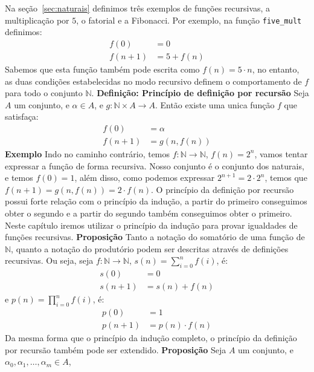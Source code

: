 Na seção~\ref{sec:naturais} definimos três exemplos de funções recursivas, a multiplicação por $5$, o fatorial e a Fibonacci.
Por exemplo, na função \lstinline{five_mult} definimos:
\begin{align*}
    f(0) &= 0  \\
     f(n+1) &= 5 + f(n) 
\end{align*}
Sabemos que esta função também pode escrita como $f(n) = 5\cdot n$, no entanto, as duas condições estabelecidas
no modo recursivo definem o comportamento de $f$ para todo o conjunto $\mathbb{N}$.
\newline \textbf{Definição: Princípio de definição por recursão} Seja $A$ um conjunto, e $\alpha \in A$,
e $g : \mathbb{N} \times A \to A$. Então existe uma unica função $f$ que satisfaça:
\begin{align*}
     f(0) &= \alpha \\
     f(n+1) &= g(n, f(n))
\end{align*} 
\textbf{Exemplo} Indo no caminho contrário, temos $f : \mathbb{N} \to \mathbb{N}$, $f(n) = 2^n$, vamos
tentar expressar a função de forma recursiva. Nosso conjunto é o conjunto dos naturais, e temos $f(0) = 1$,
além disso, como podemos expressar $2^{n+1} = 2\cdot 2^{n}$, temos que $f(n+1) = g(n, f(n)) = 2\cdot f(n)$.
\newline O princípio da definição por recursão possui forte relação com o princípio da indução, a partir do
primeiro conseguimos obter o segundo e a partir do segundo também conseguimos obter o primeiro. Neste capítulo
iremos utilizar o princípio da indução para provar igualdades de funções recursivas. 
\newline \textbf{Proposição} Tanto a notação do somatório de uma função de $\mathbb{N}$, quanto a notação
do produtório podem ser descritas através de definições recursivas. Ou seja, seja $f : \mathbb{N} \to 
\mathbb{N}$, $s(n) = \sum_{i=0}^{n} f(i)$, é:
\begin{align*}
     s(0) &= 0 \\
    s(n+1) &= s(n)+f(n)
\end{align*}
e $p(n) = \prod_{i=0}^n f(i)$, é:
\begin{align*}
    p(0) &= 1 \\
    p(n+1) &= p(n)\cdot f(n)
\end{align*}
Da mesma forma que o princípio da indução completo, o princípio da definição por recursão também pode ser
extendido.
\newline \textbf{Proposição} Seja $A$ um conjunto, e $\alpha_0, \alpha_1, \dots, \alpha_m \in A$,

